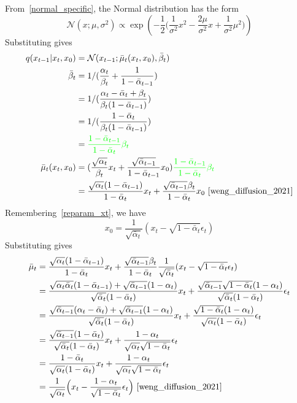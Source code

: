 \documentclass{book}
\numberwithin{equation}{subsection}
\begin{document}
From~\ref{normal_specific}, the Normal distribution has the form
\begin{equation}
    \mathcal{N}(x; \mu, \sigma^2)\propto  \exp\left(-\frac {1}{2}\Big(\frac {1}{\sigma^2}x^2-\frac {2\mu}{\sigma^2} x+\frac {1}{\sigma^2}\mu^2\Big)\right)
\end{equation}
Substituting gives
\begin{align}
q(x_{t-1}|x_t, x_0) &= \mathcal{N}(x_{t-1}; \bar{\mu}_t(x_t, x_0), \bar{\beta}_t)\\
\bar{\beta}_t
&= 1/(\frac{\alpha_t}{\beta_t} + \frac{1}{1 - \bar{\alpha}_{t-1}})\\
&= 1/(\frac{\alpha_t - \bar{\alpha}_t + \beta_t}{\beta_t(1 - \bar{\alpha}_{t-1})})\\
&= 1/(\frac{1 - \bar{\alpha}_t}{\beta_t(1 - \bar{\alpha}_{t-1})})\\
&= \color{green}{\frac{1 - \bar{\alpha}_{t-1}}{1 - \bar{\alpha}_t}\beta_t} \\
\bar{\mu}_t(x_t, x_0) &= (\frac{\sqrt{\alpha_t}}{\beta_t} x_t + \frac{\sqrt{\bar{\alpha}_{t-1} }}{1 - \bar{\alpha}_{t-1}} x_0) \color{green}{\frac{1 - \bar{\alpha}_{t-1}}{1 - \bar{\alpha}_t}\beta_t} \\
&= \frac{\sqrt{\alpha_t}(1 - \bar{\alpha}_{t-1})}{1 - \bar{\alpha}_t} x_t + \frac{\sqrt{\bar{\alpha}_{t-1}}\beta_t}{1 - \bar{\alpha}_t} x_0~\cite{weng_diffusion_2021}
\end{align}
Remembering~\ref{reparam_xt}, we have
\begin{equation}
    x_0 = \frac{1}{\sqrt{\bar{\alpha}_t}}(x_t - \sqrt{1 - \bar{\alpha}_t}\epsilon_t)\label{x02xt}
\end{equation}
Substituting gives
\begin{align}
\bar{\mu}_t
&= \frac{\sqrt{\alpha_t}(1 - \bar{\alpha}_{t-1})}{1 - \bar{\alpha}_t} x_t + \frac{\sqrt{\bar{\alpha}_{t-1}}\beta_t}{1 - \bar{\alpha}_t} \frac{1}{\sqrt{\bar{\alpha}_t}}(x_t - \sqrt{1 - \bar{\alpha}_t}\epsilon_t)\\
&= \frac{\sqrt{\alpha_t\bar{\alpha}_t}(1-\bar{\alpha}_{t-1})+\sqrt{\bar{\alpha}_{t-1}}(1-\alpha_t)}{\sqrt{\bar{\alpha}_t}(1-\bar{\alpha}_t)}x_t+\frac{\sqrt{\bar{\alpha}_{t-1}}\sqrt{1-\bar{\alpha}_t}(1-\alpha_t)}{\sqrt{\bar{\alpha}_t}(1-\bar{\alpha}_t)}\epsilon_t\\
&= \frac{\sqrt{\bar{\alpha}_{t-1}}(\alpha_t-\bar{\alpha}_t)+\sqrt{\bar{\alpha}_{t-1}}(1-\alpha_t)}{\sqrt{\bar{\alpha}_t}(1-\bar{\alpha}_t)}x_t+\frac{\sqrt{1-\bar{\alpha}_t}(1-\alpha_t)}{\sqrt{\alpha_t}(1-\bar{\alpha}_t)}\epsilon_t\\
&= \frac{\sqrt{\bar{\alpha}_{t-1}}(1-\bar{\alpha}_t)}{\sqrt{\bar{\alpha}_t}(1-\bar{\alpha}_t)}x_t+\frac{1-\alpha_t}{\sqrt{\alpha_t}\sqrt{1-\bar{\alpha}_t}}\epsilon_t\\
&= \frac{1-\bar{\alpha}_t}{\sqrt{\alpha_t}(1-\bar{\alpha}_t)}x_t+\frac{1-\alpha_t}{\sqrt{\alpha_t}\sqrt{1-\bar{\alpha}_t}}\epsilon_t\\
&= \frac{1}{\sqrt{\alpha_t}} \Big(x_t - \frac{1 - \alpha_t}{\sqrt{1 - \bar{\alpha}_t}} \epsilon_t \Big)~\cite{weng_diffusion_2021}
\end{align}
\end{document}
